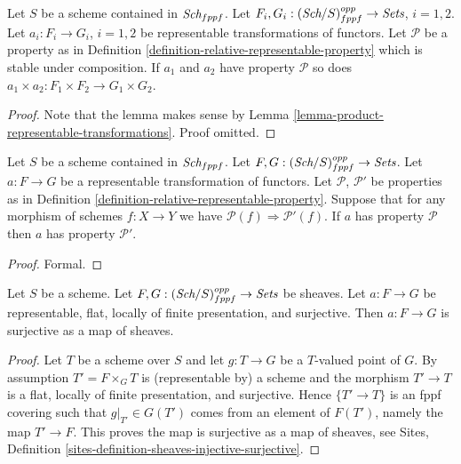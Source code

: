\begin{lemma}
\label{lemma-product-representable-transformations-property}
Let $S$ be a scheme contained in $\textit{Sch}_{fppf}$.
Let $F_i, G_i : (\textit{Sch}/S)_{fppf}^{opp} \to \textit{Sets}$,
$i = 1, 2$.
Let $a_i : F_i \to G_i$, $i = 1, 2$ be representable transformations
of functors.
Let $\mathcal{P}$ be a property as in
Definition \ref{definition-relative-representable-property}
which is stable under composition.
If $a_1$ and $a_2$ have property $\mathcal{P}$ so does
$a_1 \times a_2 : F_1 \times F_2 \longrightarrow G_1 \times G_2$.
\end{lemma}

\begin{proof}
Note that the lemma makes sense by
Lemma \ref{lemma-product-representable-transformations}.
Proof omitted.
\end{proof}

\begin{lemma}
\label{lemma-representable-transformations-property-implication}
Let $S$ be a scheme contained in $\textit{Sch}_{fppf}$.
Let $F, G : (\textit{Sch}/S)_{fppf}^{opp} \to \textit{Sets}$.
Let $a : F \to G$ be a representable transformation of functors.
Let $\mathcal{P}$, $\mathcal{P}'$ be properties as in
Definition \ref{definition-relative-representable-property}.
Suppose that for any morphism of schemes $f : X \to Y$
we have $\mathcal{P}(f) \Rightarrow \mathcal{P}'(f)$.
If $a$ has property $\mathcal{P}$ then
$a$ has property $\mathcal{P}'$.
\end{lemma}

\begin{proof}
Formal.
\end{proof}

\begin{lemma}
\label{lemma-surjective-flat-locally-finite-presentation}
Let $S$ be a scheme.
Let $F, G : (\textit{Sch}/S)_{fppf}^{opp} \to \textit{Sets}$ be sheaves.
Let $a : F \to G$ be representable, flat,
locally of finite presentation, and surjective.
Then $a : F \to G$ is surjective as a map of sheaves.
\end{lemma}

\begin{proof}
Let $T$ be a scheme over $S$ and let $g : T \to G$ be a $T$-valued point of
$G$. By assumption $T' = F \times_G T$ is (representable by) a scheme and
the morphism $T' \to T$ is a flat, locally of finite presentation, and
surjective. Hence $\{T' \to T\}$ is an fppf covering such
that $g|_{T'} \in G(T')$ comes from an element of $F(T')$, namely
the map $T' \to F$. This proves the map is surjective as
a map of sheaves, see
Sites, Definition \ref{sites-definition-sheaves-injective-surjective}.
\end{proof}

